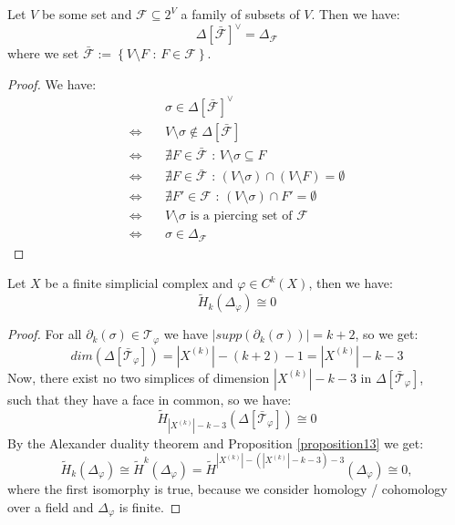 \begin{prop}\label{proposition13}
Let \(V\) be some set and \(\mathcal{F}\subseteq 2^V\) a family of subsets of \(V\). Then we have:
\[
\Delta\left[\bar{\mathcal{F}}\right]^{\lor}=\Delta_{\mathcal{F}}
\]
where we set \(\bar{\mathcal{F}}:=\left\{V\setminus F\text{ : }F\in\mathcal{F}\right\}\).
\begin{proof}
We have:
\begin{align*}
  & \sigma\in\Delta\left[\bar{\mathcal{F}}\right]^{\lor} \\
  \Longleftrightarrow \quad & V\setminus\sigma\notin\Delta\left[\bar{\mathcal{F}}\right] \\
  \Longleftrightarrow \quad & \nexists F\in\bar{\mathcal{F}}\text{ : }V\setminus\sigma\subseteq F \\
  \Longleftrightarrow \quad & \nexists F\in\bar{\mathcal{F}}\text{ : }(V\setminus\sigma)\cap(V\setminus F)=\emptyset \\
  \Longleftrightarrow \quad & \nexists F'\in\mathcal{F}\text{ : }(V\setminus\sigma)\cap F'=\emptyset \\
  \Longleftrightarrow \quad & V\setminus\sigma\text{ is a piercing set of }\mathcal{F} \\
  \Longleftrightarrow \quad & \sigma\in\Delta_{\mathcal{F}}
 \end{align*}
\end{proof}
\end{prop}

\begin{thm}
Let \(X\) be a finite simplicial complex and \(\varphi\in C^k(X)\), then we have:
\[
\tilde{H}_k(\Delta_{\varphi})\cong 0
\]
\begin{proof}
For all \(\partial_k(\sigma)\in\mathcal{T}_{\varphi}\) we have \(|supp(\partial_k(\sigma))|=k+2\), so we get:
\[
dim(\Delta[\bar{\mathcal{T}}_{\varphi}])=|X^{(k)}|-(k+2)-1=|X^{(k)}|-k-3
\]
Now, there exist no two simplices of dimension \(|X^{(k)}|-k-3\) in \(\Delta[\bar{\mathcal{T}}_{\varphi}]\),\\
such that they have a face in common, so we have:
\[
\tilde{H}_{|X^{(k)}|-k-3}(\Delta[\bar{\mathcal{T}}_{\varphi}])\cong 0
\]
By the Alexander duality theorem and Proposition \ref{proposition13} we get:
\[
\tilde{H}_k(\Delta_{\varphi})\cong\tilde{H}^k(\Delta_{\varphi})=\tilde{H}^{|X^{(k)}|-(|X^{(k)}|-k-3)-3}(\Delta_{\varphi})\cong 0,
\]
where the first isomorphy is true, because we consider homology / cohomology over a field and \(\Delta_{\varphi}\) is finite.
\end{proof}
\end{thm}


